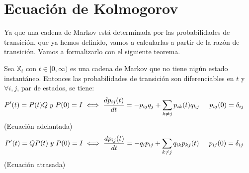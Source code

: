 \documentclass[12pt,a4paper]{article}
\begin{document}
\section{Ecuación de Kolmogorov}
	Ya que una cadena de Markov está determinada por las probabilidades de transición, que ya hemos definido, vamos a calcularlas a partir de la razón de transición. Vamos a formalizarlo con el siguiente teorema.
	\begin{theorem} Sea $\mathbb{X}_{t}$ con $t \in [0,\infty)$ es una cadena de Markov que no tiene nigún estado instantáneo. Entonces las probabilidades de transición son diferenciables en $t$ y $\forall i,j$, par de estados, se tiene:
		\begin{equation*}
			P'(t) = P(t)Q\hspace{0.1cm}y\hspace{0.1cm}P(0) = I \iff \frac{dp_{ij}(t)}{dt} = -p_{ij}q_{j} + \sum_{k \neq j} p_{ik}(t)q_{kj} \hspace{0.5cm} p_{ij}(0) = \delta_{ij} \hspace{0.5cm}
		\end{equation*}
		(Ecuación adelantada)
		\begin{equation*}
			P'(t) = QP(t)\hspace{0.1cm}y\hspace{0.1cm}P(0) = I \iff \frac{dp_{ij}(t)}{dt} = -q_{i}p_{ij} + \sum_{k \neq j} q_{ik}p_{kj}(t) \hspace{0.5cm} p_{ij}(0) = \delta_{ij} \hspace{0.5cm}
		\end{equation*}
		(Ecuación atrasada)
	\end{theorem}
\end{document}
